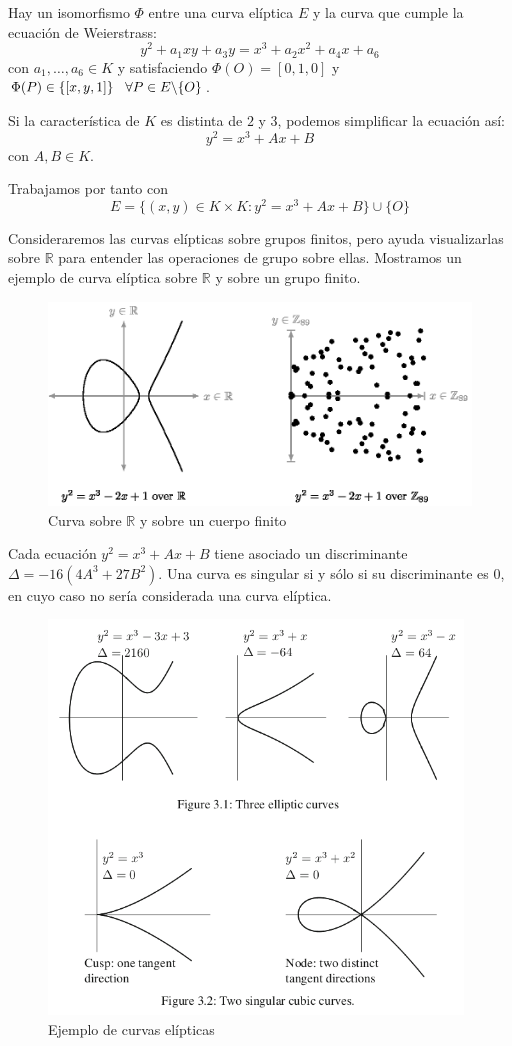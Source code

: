 \documentclass{article}
\begin{document}
Hay un isomorfismo $\Phi$ entre una curva elíptica $E$ y la curva que
cumple la ecuación de Weierstrass:
$$ y^2 + a_1xy + a_3y = x^3 + a_2x^2 + a_4x + a_6$$
con $a_1, \ldots, a_6 \in K$ y satisfaciendo $\Phi(O) = [0,1,0]$ y
$\Phi(P) \in \{[x,y,1]\} \hspace{3mm} \forall P \in E \backslash
\{O\}$.

Si la característica de $K$ es distinta de $2$ y $3$, podemos
simplificar la ecuación así:
$$y^2 = x^3 + Ax + B$$ con $A, B \in K$.

Trabajamos por tanto con \[E=\{(x,y)\in K\times K:y^2=x^3+Ax+B\}\cup\{O\}\]

Consideraremos las curvas elípticas sobre grupos finitos, pero ayuda
visualizarlas sobre $\mathbb{R}$ para entender las operaciones de
grupo sobre ellas. Mostramos un ejemplo de curva elíptica sobre
$\mathbb{R}$ y sobre un grupo finito.

\begin{figure}[H] \centering
  \includegraphics[width=120mm]{imagenes/curvas_Fp}
  \caption{Curva sobre $\mathbb{R}$ y sobre un cuerpo finito}
\end{figure}

Cada ecuación $y^2 = x^3 + Ax + B$ tiene asociado un discriminante $
\Delta = -16(4A^3 + 27B^2)$. Una curva es singular si y sólo si su
discriminante es $0$, en cuyo caso no sería considerada una curva
elíptica.

\begin{figure}[H] \centering
  \includegraphics[width=110mm]{imagenes/curvas}
  \caption{Ejemplo de curvas elípticas}
\end{figure}
\end{document}
